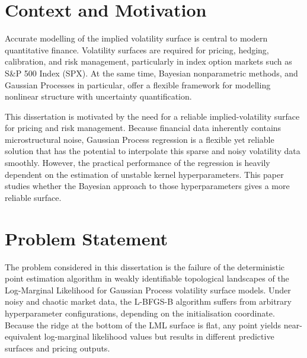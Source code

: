 \documentclass[12pt,oneside]{report}
\theoremstyle{definition}
\theoremstyle{remark}
\begin{document}
\section{Context and Motivation}
Accurate modelling of the implied volatility surface is central to modern quantitative finance. Volatility surfaces are required for pricing, hedging, calibration, and risk management, particularly in index option markets such as S\&P 500 Index (SPX). At the same time, Bayesian nonparametric methods, and Gaussian Processes in particular, offer a flexible framework for modelling nonlinear structure with uncertainty quantification.

This dissertation is motivated by the need for a reliable implied-volatility surface for pricing and risk management. Because financial data inherently contains microstructural noise, Gaussian Process regression is a flexible yet reliable solution that has the potential to interpolate this sparse and noisy volatility data smoothly. However, the practical performance of the regression is heavily dependent on the estimation of unstable kernel hyperparameters. This paper studies whether the Bayesian approach to those hyperparameters gives a more reliable surface.

\section{Problem Statement}

The problem considered in this dissertation is the failure of the deterministic point estimation algorithm in weakly identifiable topological landscapes of the Log-Marginal Likelihood for Gaussian Process volatility surface models. Under noisy and chaotic market data, the L-BFGS-B algorithm suffers from arbitrary hyperparameter configurations, depending on the initialisation coordinate. Because the ridge at the bottom of the LML surface is flat, any point yields near-equivalent log-marginal likelihood values but results in different predictive surfaces and pricing outputs.
\end{document}
